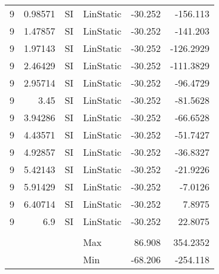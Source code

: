 \begin{table}[H]
{\begin{tabular}{rrrlrr}
    \multicolumn{1}{l}{9} & 0.98571 & \multicolumn{1}{l}{SI} & LinStatic & -30.252 & -156.113 \\
    \multicolumn{1}{l}{9} & 1.47857 & \multicolumn{1}{l}{SI} & LinStatic & -30.252 & -141.203 \\
    \multicolumn{1}{l}{9} & 1.97143 & \multicolumn{1}{l}{SI} & LinStatic & -30.252 & -126.2929 \\
    \multicolumn{1}{l}{9} & 2.46429 & \multicolumn{1}{l}{SI} & LinStatic & -30.252 & -111.3829 \\
    \multicolumn{1}{l}{9} & 2.95714 & \multicolumn{1}{l}{SI} & LinStatic & -30.252 & -96.4729 \\
    \multicolumn{1}{l}{9} & 3.45 & \multicolumn{1}{l}{SI} & LinStatic & -30.252 & -81.5628 \\
    \multicolumn{1}{l}{9} & 3.94286 & \multicolumn{1}{l}{SI} & LinStatic & -30.252 & -66.6528 \\
    \multicolumn{1}{l}{9} & 4.43571 & \multicolumn{1}{l}{SI} & LinStatic & -30.252 & -51.7427 \\
    \multicolumn{1}{l}{9} & 4.92857 & \multicolumn{1}{l}{SI} & LinStatic & -30.252 & -36.8327 \\
    \multicolumn{1}{l}{9} & 5.42143 & \multicolumn{1}{l}{SI} & LinStatic & -30.252 & -21.9226 \\
    \multicolumn{1}{l}{9} & 5.91429 & \multicolumn{1}{l}{SI} & LinStatic & -30.252 & -7.0126 \\
    \multicolumn{1}{l}{9} & 6.40714 & \multicolumn{1}{l}{SI} & LinStatic & -30.252 & 7.8975 \\
    \multicolumn{1}{l}{9} & 6.9 & \multicolumn{1}{l}{SI} & LinStatic & -30.252 & 22.8075 \\
        &     &     &     &     &  \\
        &     &     & Max & 86.908 & 354.2352 \\
        &     &     & Min & -68.206 & -254.118 \\
    \end{tabular}%
  \label{tab:addlabel}%
  }
\end{table}%
